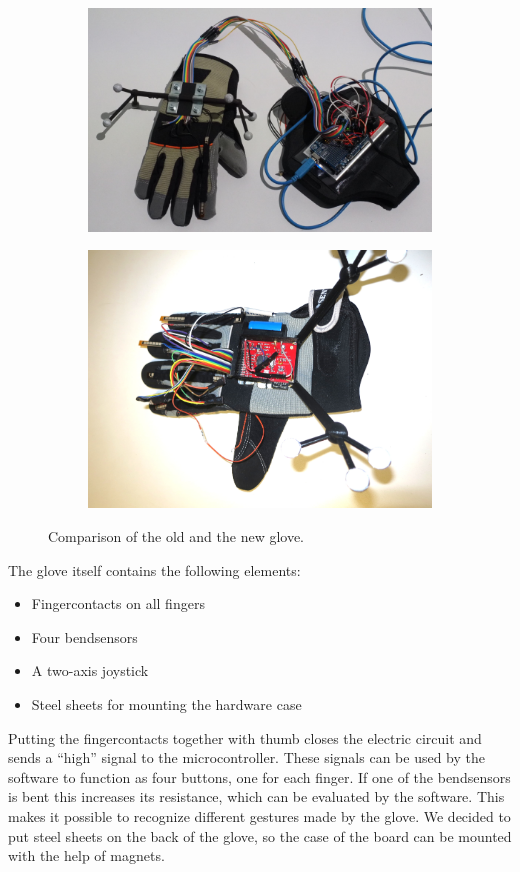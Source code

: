 \begin{figure}
	\begin{subfigure}{.5\textwidth}
		\centering
		\includegraphics[width=.8\linewidth]{./images/image14.png}
	\end{subfigure}%
	\begin{subfigure}{.5\textwidth}
		\centering
		\includegraphics[width=.8\linewidth]{./images/image15.png}
	\end{subfigure}
	\caption{Comparison of the old and the new glove.}
	\label{fig:compare}
\end{figure}

The glove itself contains the following elements:
\begin{itemize}
	\item Fingercontacts on all fingers
	\item Four bendsensors
	\item A two-axis joystick
	\item Steel sheets for mounting the hardware case	
\end{itemize}

Putting the fingercontacts together with thumb closes the electric circuit and sends a “high” signal to the microcontroller. These signals can be used by the software to function as four buttons, one for each finger. If one of the bendsensors is bent this increases its resistance, which can be evaluated by the software. This makes it possible to recognize different gestures made by the glove. We decided to put steel sheets on the back of the glove, so the case of the board can be mounted with the help of magnets. 



